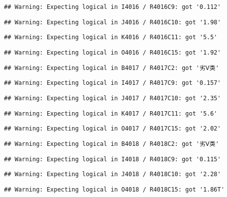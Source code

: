 \documentclass[
]{article}
\begin{document}
\begin{verbatim}
## Warning: Expecting logical in I4016 / R4016C9: got '0.112'
\end{verbatim}

\begin{verbatim}
## Warning: Expecting logical in J4016 / R4016C10: got '1.98'
\end{verbatim}

\begin{verbatim}
## Warning: Expecting logical in K4016 / R4016C11: got '5.5'
\end{verbatim}

\begin{verbatim}
## Warning: Expecting logical in O4016 / R4016C15: got '1.92'
\end{verbatim}

\begin{verbatim}
## Warning: Expecting logical in B4017 / R4017C2: got '劣Ⅴ类'
\end{verbatim}

\begin{verbatim}
## Warning: Expecting logical in I4017 / R4017C9: got '0.157'
\end{verbatim}

\begin{verbatim}
## Warning: Expecting logical in J4017 / R4017C10: got '2.35'
\end{verbatim}

\begin{verbatim}
## Warning: Expecting logical in K4017 / R4017C11: got '5.6'
\end{verbatim}

\begin{verbatim}
## Warning: Expecting logical in O4017 / R4017C15: got '2.02'
\end{verbatim}

\begin{verbatim}
## Warning: Expecting logical in B4018 / R4018C2: got '劣Ⅴ类'
\end{verbatim}

\begin{verbatim}
## Warning: Expecting logical in I4018 / R4018C9: got '0.115'
\end{verbatim}

\begin{verbatim}
## Warning: Expecting logical in J4018 / R4018C10: got '2.28'
\end{verbatim}

\begin{verbatim}
## Warning: Expecting logical in O4018 / R4018C15: got '1.86T'
\end{verbatim}
\end{document}
